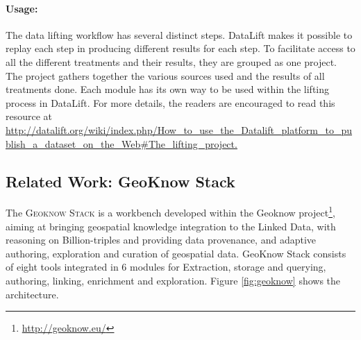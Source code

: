\paragraph{Usage:}
The data lifting workflow has several distinct steps. DataLift makes it possible to replay each step in producing different results for each step. To facilitate access to all the different treatments and their results, they are grouped as one project. The project gathers together the various sources used and the results of all treatments done.
Each module has its own way to be used within the lifting process in DataLift. For more details, the readers are encouraged to read this resource at \url{http://datalift.org/wiki/index.php/How_to_use_the_Datalift_platform_to_publish_a_dataset_on_the_Web#The_lifting_project. 
}



\subsection{Related Work: GeoKnow Stack}
\label{sec:geoknow}

The \textsc{Geoknow Stack} is a workbench developed within the Geoknow project\footnote{\url{http://geoknow.eu/}}, aiming at bringing geospatial knowledge integration to the Linked Data, with reasoning on Billion-triples and providing data provenance, and adaptive authoring, exploration and curation of geospatial data. GeoKnow Stack consists of eight tools integrated in 6 modules for Extraction, storage and querying, authoring, linking, enrichment and exploration. Figure \ref{fig:geoknow} shows the architecture. 

